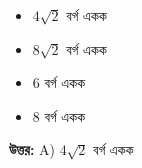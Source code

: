 \documentclass[12pt, a4paper]{article}
\begin{document}
\begin{itemize}[label={}, leftmargin=1cm, itemsep=0.5em]
    \item[\textbf{A)}] $4\sqrt{2}$ বর্গ একক
    \item[\textbf{B)}] $8\sqrt{2}$ বর্গ একক
    \item[\textbf{C)}] $6$ বর্গ একক
    \item[\textbf{D)}] $8$ বর্গ একক
\end{itemize}

\vspace{0.5em}
\begin{tcolorbox}[answerbox]
    \textbf{\color{success} উত্তর:} A) $4\sqrt{2}$ বর্গ একক
\end{tcolorbox}
\vspace{1em}
\end{document}
